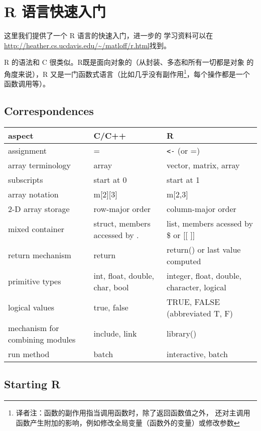 \chapter{R 语言快速入门}
\label{chap:rquickstart}

这里我们提供了一个 R 语言的快速入门，进一步的
学习资料可以在
\url{http://heather.cs.ucdavis.edu/~/matloff/r.html}找到。

R 的语法和 C 很类似。R既是面向对象的（从封装、多态和所有一切都是对象
的角度来说），R 又是一门函数式语言（比如几乎没有副作用\footnote{
译者注：函数的副作用指当调用函数时，除了返回函数值之外，
还对主调用函数产生附加的影响，例如修改全局变量（函数外的变量）或修改参数}，每个操作都是一个
函数调用等）。

\section{Correspondences}

\begin{tabular}{|l|l|l|}
\hline
aspect & C/C++ & R \\ \hline
\hline
assignment & = & \verb#<-# (or =) \\ \hline
array terminology & array & vector, matrix, array \\ \hline
subscripts & start at 0 & start at 1 \\ \hline
array notation & m[2][3] & m[2,3] \\ \hline
2-D array storage & row-major order & column-major order \\ \hline
mixed container &struct, members accessed by . & list, members acessed by
\$ or [[ ]] \\ \hline
return mechanism & return & return() or last value computed \\ \hline
primitive types & int, float, double, char, bool & integer, float,
double, character, logical \\ \hline
logical values & true, false & TRUE, FALSE (abbreviated T, F) \\ \hline
mechanism for combining modules & include, link & library() \\ \hline
run method & batch & interactive, batch \\ \hline
\end{tabular}

\section{Starting R}

